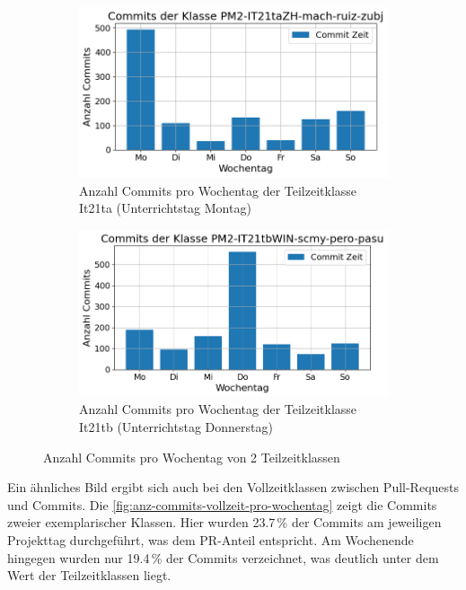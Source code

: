 \begin{figure}[htbp]
    \centering
    \begin{subfigure}[b]{0.48\textwidth}
        \centering
        \includegraphics[width=\textwidth]{Figures/commits-klasse-per-wochentag-21ta.png}
         \caption{Anzahl Commits pro Wochentag der Teilzeitklasse It21ta (Unterrichtstag Montag)}
        \label{fig:anzahl-commits-pro-wochentag-it21ta}
    \end{subfigure}
    \hfill
    \begin{subfigure}[b]{0.48\textwidth}
        \centering
        \includegraphics[width=\textwidth]{Figures/commits-klasse-per-wochentag-21tb.png}
         \caption{Anzahl Commits pro Wochentag der Teilzeitklasse It21tb (Unterrichtstag Donnerstag)}
        \label{fig:anzahl-commits-pro-wochentag-it21tb}
    \end{subfigure}
    \caption{Anzahl Commits pro Wochentag von 2 Teilzeitklassen}
    \label{fig:anz-commits-teilzeit-pro-wochentag}
\end{figure}

Ein ähnliches Bild ergibt sich auch bei den Vollzeitklassen zwischen Pull-Requests und Commits. Die \autoref{fig:anz-commits-vollzeit-pro-wochentag} zeigt die Commits zweier exemplarischer Klassen. Hier wurden 23.7\,\% der Commits am jeweiligen Projekttag durchgeführt, was dem PR-Anteil entspricht. Am Wochenende hingegen wurden nur 19.4\,\% der Commits verzeichnet, was deutlich unter dem Wert der Teilzeitklassen liegt.

